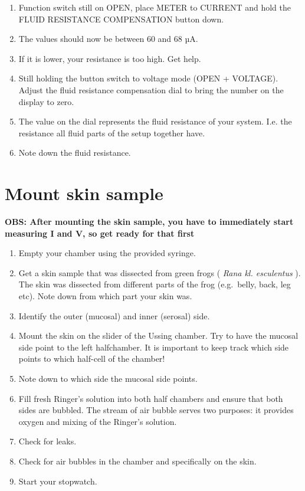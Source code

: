 \documentclass[
]{book}
\begin{document}
\begin{enumerate}
\def\labelenumi{\arabic{enumi}.}
\item
  Function switch still on OPEN, place METER to CURRENT and hold the FLUID RESISTANCE COMPENSATION button down.
\item
  The values should now be between 60 and 68 µA.
\item
  If it is lower, your resistance is too high. Get help.
\item
  Still holding the button switch to voltage mode (OPEN + VOLTAGE). Adjust the fluid resistance compensation dial to bring the number on the display to zero.
\item
  The value on the dial represents the fluid resistance of your system. I.e. the resistance all fluid parts of the setup together have.
\item
  Note down the fluid resistance.
\end{enumerate}

\section{Mount skin sample}\label{mount-skin-sample}

\textbf{OBS: After mounting the skin sample, you have to immediately start measuring I and V, so get ready for that first}

\begin{enumerate}
\def\labelenumi{\arabic{enumi}.}
\item
  Empty your chamber using the provided syringe.
\item
  Get a skin sample that was dissected from green frogs ( \emph{Rana kl. esculentus} ). The skin was dissected from different parts of the frog (e.g.~belly, back, leg etc). Note down from which part your skin was.
\item
  Identify the outer (mucosal) and inner (serosal) side.
\item
  Mount the skin on the slider of the Ussing chamber. Try to have the mucosal side point to the left halfchamber. It is important to keep track which side points to which half-cell of the chamber!
\item
  Note down to which side the mucosal side points.
\item
  Fill fresh Ringer's solution into both half chambers and ensure that both sides are bubbled. The stream of air bubble serves two purposes: it provides oxygen and mixing of the Ringer's solution.
\item
  Check for leaks.
\item
  Check for air bubbles in the chamber and specifically on the skin.
\item
  Start your stopwatch.
\end{enumerate}
\end{document}
